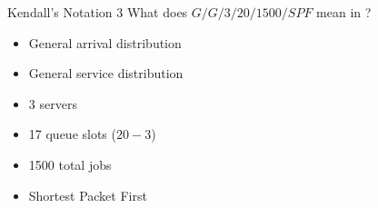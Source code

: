 \begin{example}[Lecture 3]{Kendall's Notation 3}
  What does $G/G/3/20/1500/SPF$ mean in ?
  \begin{itemize}[noitemsep]
  \item General arrival distribution
  \item General service distribution
  \item 3 servers
  \item 17 queue slots ($20-3$)
  \item 1500 total jobs
  \item Shortest Packet First
  \end{itemize}
\end{example}

